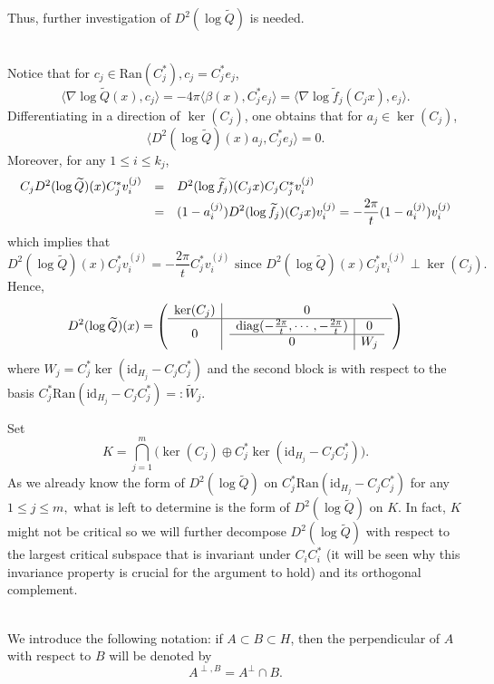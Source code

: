 \documentclass[11pt,a4paper,reqno]{amsart}
\numberwithin{equation}{section}
\theoremstyle{definition}
\newcommand{\nm}{\noalign{\smallskip}}
\newcommand{\ds}{\displaystyle}
\renewcommand{\tilde}{\widetilde}
\newcommand{\<}{\ensuremath \leq}
\renewcommand{\>}{\ensuremath \geq}
\renewcommand{\tilde}{\widetilde}
\begin{document}
Thus, further investigation of $D^2 (\log \tilde Q)$ is needed.  

\hfill \\

Notice that for $c_j \in \mathrm{Ran}(C_j^*), c_j=C_j^*e_j$, $$\langle \nabla \log\tilde Q(x),c_j\rangle=-4\pi\langle \beta(x), C_j^*e_j\rangle=\langle \nabla \log \tilde f_j(C_jx),e_j\rangle.$$ Differentiating in a direction of $\ker(C_j)$, one obtains that for $a_j \in \ker(C_j)$, $$\langle D^2 (\log \tilde Q)(x)a_j,C_j^*e_j \rangle=0.$$ Moreover, for any $1 \leq i \leq k_j$, $$\begin{array}{lll}
C_jD^2(\log \tilde Q)(x)C_j^*v_i^{(j)} &=& D^2(\log \tilde f_j)(C_jx)C_jC_j^*v_i^{(j)} \\
\nm 
&=& \ds (1-a_i^{(j)})D^2(\log \tilde f_j)(C_jx)v_i^{(j)}=-\frac{2\pi}{t}(1-a_i^{(j)})v_i^{(j)}
\end{array}$$ which implies that $$D^2(\log \tilde Q)(x)C_j^*v_i^{(j)}=-\frac{2\pi}{t}C_j^*v_i^{(j)} \text{ since } D^2(\log \tilde Q)(x)C_j^*v_i^{(j)} \perp \ker(C_j).$$ Hence, $$D^2(\log \tilde Q)(x)=\left(\begin{array}{ c | c }
    \ker(C_j) & 0 \\
    \hline
    0 & \left. \begin{array}{ c | c }
    \mathrm{diag}(-\frac{2\pi}{t},\cdots,-\frac{2\pi}{t}) & 0  \\
    \hline
    0 & W_j
  \end{array} \right.
  \end{array}\right)$$
where $W_j=C_j^*\ker(\mathrm{id}_{H_j}-C_jC_j^*)$ and the second block is with respect to the basis $C_j^*\mathrm{Ran}(\mathrm{id}_{H_j}-C_jC_j^*) =: \tilde W_j.$ 

\bigskip


Set $$K=\bigcap_{j=1}^m \bigl( \ker(C_j) \oplus C_j^*\ker(\mathrm{id}_{H_j}-C_jC_j^*) \bigl).$$
As we already know the form of $D^2(\log \tilde Q)$ on $C_j^*\mathrm{Ran}(\mathrm{id}_{H_j}-C_jC_j^*)$ for any $1 \leq j \leq m,$ what is left to determine is the form of $D^2(\log \tilde Q)$ on $K.$ In fact, $K$ might not be critical so we will further decompose $D^2(\log \tilde Q)$ with respect to the largest critical subspace that is invariant under $C_iC_i^*$ (it will be seen why this invariance property is crucial for the argument to hold) and its orthogonal complement. 

\hfill \\

We introduce the following notation: if $A \subset B \subset H$, then the perpendicular of $A$ with respect to $B$ will be denoted by $$A^{\perp,B}=A^\perp \cap B.$$ 
\end{document}

